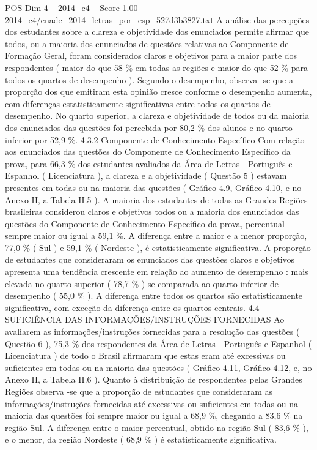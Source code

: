\begin{textsample}{POS Dim 4 – 2014\_c4 – Score 1.00 – 2014\_c4/enade\_2014\_letras\_por\_esp\_527d3b3827.txt}
A análise das percepções dos estudantes sobre a clareza e objetividade dos enunciados permite afirmar que todos, ou a maioria dos enunciados de questões relativas ao Componente de Formação Geral, foram considerados claros e objetivos para a maior parte dos respondentes ( maior do que 58 \% em todas as regiões e maior do que 52 \% para todos os quartos de desempenho ).
Segundo o desempenho, observa -se que a proporção dos que emitiram esta opinião cresce conforme o desempenho aumenta, com diferenças estatisticamente significativas entre todos os quartos de desempenho.
No quarto superior, a clareza e objetividade de todos ou da maioria dos enunciados das questões foi percebida por 80,2 \% dos alunos e no quarto inferior por 52,9 \%. 4.3.2 Componente de Conhecimento Específico Com relação aos enunciados das questões do Componente de Conhecimento Específico da prova, para 66,3 \% dos estudantes avaliados da Área de Letras - Português e Espanhol ( Licenciatura ), a clareza e a objetividade ( Questão 5 ) estavam presentes em todas ou na maioria das questões ( Gráfico 4.9, Gráfico 4.10, e no Anexo II, a Tabela II.5 ).
A maioria dos estudantes de todas as Grandes Regiões brasileiras considerou claros e objetivos todos ou a maioria dos enunciados das questões do Componente de Conhecimento Específico da prova, percentual sempre maior ou igual a 59,1 \%.
A diferença entre a maior e a menor proporção, 77,0 \% ( Sul ) e 59,1 \% ( Nordeste ), é estatisticamente significativa.
A proporção de estudantes que consideraram os enunciados das questões claros e objetivos apresenta uma tendência crescente em relação ao aumento de desempenho : mais elevada no quarto superior ( 78,7 \% ) se comparada ao quarto inferior de desempenho ( 55,0 \% ).
A diferença entre todos os quartos são estatisticamente significativa, com exceção da diferença entre os quartos centrais. 4.4 SUFICIÊNCIA DAS INFORMAÇÕES/INSTRUÇÕES FORNECIDAS Ao avaliarem as informações/instruções fornecidas para a resolução das questões ( Questão 6 ), 75,3 \% dos respondentes da Área de Letras - Português e Espanhol ( Licenciatura ) de todo o Brasil afirmaram que estas eram até excessivas ou suficientes em todas ou na maioria das questões ( Gráfico 4.11, Gráfico 4.12, e, no Anexo II, a Tabela II.6 ).
Quanto à distribuição de respondentes pelas Grandes Regiões observa -se que a proporção de estudantes que consideraram as informações/instruções fornecidas até excessivas ou suficientes em todas ou na maioria das questões foi sempre maior ou igual a 68,9 \%, chegando a 83,6 \% na região Sul.
A diferença entre o maior percentual, obtido na região Sul ( 83,6 \% ), e o menor, da região Nordeste ( 68,9 \% ) é estatisticamente significativa.

\end{textsample}
